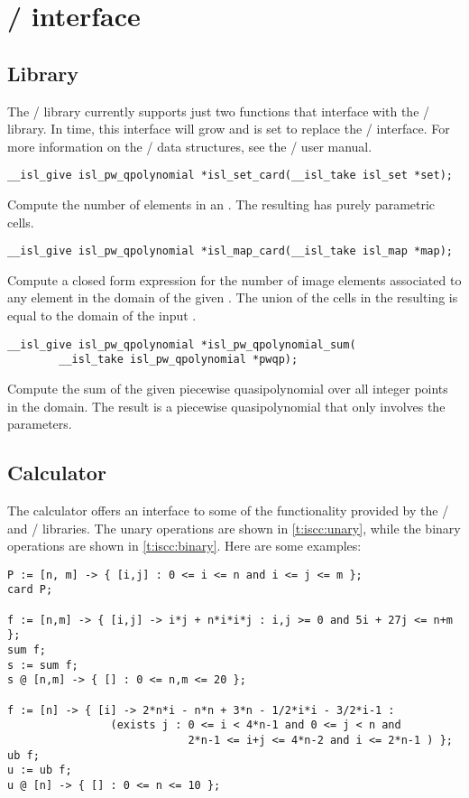 \section{\protect\isl/ interface}

\subsection{Library}

The \barvinok/ library currently supports just two
functions that interface with the \isl/ library.
In time, this interface will grow and is set to replace
the \PolyLib/ interface.
For more information on the \isl/ data structures, see
the \isl/ user manual.

\begin{verbatim}
__isl_give isl_pw_qpolynomial *isl_set_card(__isl_take isl_set *set);
\end{verbatim}
Compute the number of elements in an .
The resulting  has purely parametric cells.

\begin{verbatim}
__isl_give isl_pw_qpolynomial *isl_map_card(__isl_take isl_map *map);
\end{verbatim}
Compute a closed form expression for the number of image elements
associated to any element in the domain of the given .
The union of the cells in the resulting 
is equal to the domain of the input .

\begin{verbatim}
__isl_give isl_pw_qpolynomial *isl_pw_qpolynomial_sum(
        __isl_take isl_pw_qpolynomial *pwqp);
\end{verbatim}
Compute the sum of the given piecewise quasipolynomial over
all integer points in the domain.  The result is a piecewise
quasipolynomial that only involves the parameters.

\subsection{Calculator}

The  calculator offers an interface to some
of the functionality provided by the \isl/ and \barvinok/
libraries.
The unary operations are shown in \autoref{t:iscc:unary},
while the binary operations are shown in \autoref{t:iscc:binary}.
Here are some examples:
\begin{verbatim}
P := [n, m] -> { [i,j] : 0 <= i <= n and i <= j <= m };
card P;

f := [n,m] -> { [i,j] -> i*j + n*i*i*j : i,j >= 0 and 5i + 27j <= n+m };
sum f;
s := sum f;
s @ [n,m] -> { [] : 0 <= n,m <= 20 };

f := [n] -> { [i] -> 2*n*i - n*n + 3*n - 1/2*i*i - 3/2*i-1 :
                (exists j : 0 <= i < 4*n-1 and 0 <= j < n and
                            2*n-1 <= i+j <= 4*n-2 and i <= 2*n-1 ) };
ub f;
u := ub f;
u @ [n] -> { [] : 0 <= n <= 10 };
\end{verbatim}


